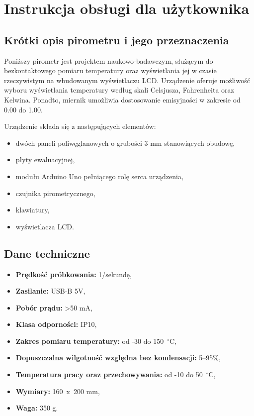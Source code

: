 \chapter{Instrukcja obsługi dla użytkownika}
\section*{Krótki opis pirometru i jego przeznaczenia}

Poniższy pirometr jest projektem naukowo-badawczym, służącym do bezkontaktowego pomiaru temperatury oraz wyświetlania jej w czasie rzeczywistym na wbudowanym wyświetlaczu LCD. Urządzenie oferuje możliwość wyboru wyświetlania temperatury według skali Celsjusza, Fahrenheita oraz Kelwina. Ponadto, miernik umożliwia dostosowanie emisyjności w zakresie od 0.00 do 1.00.

\vspace{12pt}

Urządzenie składa się z następujących elementów:
\begin{itemize}
    \item dwóch paneli poliwęglanowych o grubości 3 mm stanowiących obudowę,
    \item płyty ewaluacyjnej,
    \item modułu Arduino Uno pełniącego rolę serca urządzenia,
    \item czujnika pirometrycznego,
    \item klawiatury,
    \item wyświetlacza LCD.
\end{itemize}

\section*{Dane techniczne}
\begin{itemize}
    \item \textbf{Prędkość próbkowania:} 1/sekundę,
    \item \textbf{Zasilanie:} USB-B 5V,
    \item \textbf{Pobór prądu:} >50 mA,
    \item \textbf{Klasa odporności:} IP10,
    \item \textbf{Zakres pomiaru temperatury:} od -30 do 150~$^{\circ}$C,
    \item \textbf{Dopuszczalna wilgotność względna bez kondensacji:} 5--95\%,
    \item \textbf{Temperatura pracy oraz przechowywania:} od -10 do 50~$^{\circ}$C,
    \item \textbf{Wymiary:} 160~x~200 mm,
    \item \textbf{Waga:} 350 g.
\end{itemize}


